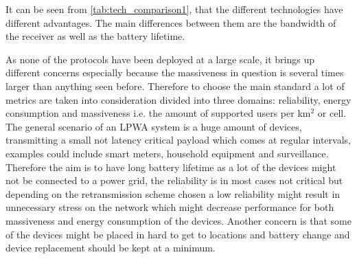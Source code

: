 
It can be seen from \autoref{tab:tech_comparison1}, that the different technologies have different advantages. The main differences between them are the bandwidth of the receiver as well as the battery lifetime. 

As none of the protocols have been deployed at a large scale, it brings up different concerns especially because the massiveness in question is several times larger than anything seen before. Therefore to choose the main standard a lot of metrics are taken into consideration divided into three domains: reliability, energy consumption and massiveness i.e. the amount of supported users per km$^2$ or cell. The general scenario of an LPWA system is a huge amount of devices, transmitting a small not latency critical payload which comes at regular intervals, examples could include smart meters, household equipment and surveillance. Therefore the aim is to have long battery lifetime as a lot of the devices might not be connected to a power grid, the reliability is in most cases not critical but depending on the retransmission scheme chosen a low reliability might result in unnecessary stress on the network which might decrease performance for both massiveness and energy consumption of the devices. Another concern is that some of the devices might be placed in hard to get to locations and battery change and device replacement should be kept at a minimum.


